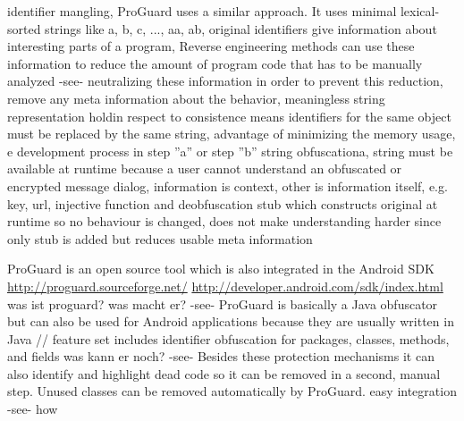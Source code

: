 %
identifier mangling, ProGuard uses a similar approach. It uses minimal
lexical-sorted strings like {a, b, c, ..., aa, ab}, original identifiers give information about interesting parts of a program, Reverse engineering methods can use these information to reduce the amount of program code that has to be manually analyzed -see-  neutralizing these information
in order to prevent this reduction,  remove any meta information about the behavior, meaningless string representation holdin respect to consistence means identifiers for the same object must be replaced by the same string,
advantage of minimizing the memory usage, e development process in step ”a” or step ”b” \newline
string obfuscationa, string must be available at runtime because a user cannot
understand an obfuscated or encrypted message dialog, information is context, other is information itself, e.g. key, url, injective function and deobfuscation stub which constructs original at runtime so no behaviour is changed, does not make understanding harder since only stub is added but reduces usable meta information\newline
\cite{schulzLabCourse}
%



ProGuard is an open source tool which is also integrated in the Android SDK
\url{http://proguard.sourceforge.net/}
\url{http://developer.android.com/sdk/index.html}\newline
was ist proguard? was macht er? -see- ProGuard is basically a Java obfuscator but can also be used for Android applications because they are usually written in Java // feature set includes identifier obfuscation for packages, classes, methods, and fields\newline
was kann er noch? -see- Besides these protection mechanisms it can also identify and highlight dead code so it can be removed in a second, manual step. Unused classes can be removed automatically by ProGuard.\newline
easy integration -see- how\newline

